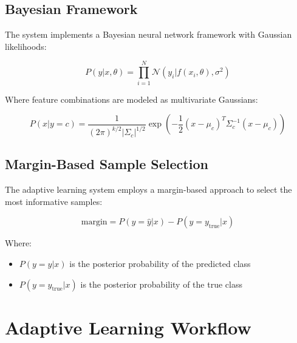 \documentclass[11pt]{article}
\begin{document}
\subsection{Bayesian Framework}

The system implements a Bayesian neural network framework with Gaussian likelihoods:

\[
P(y|x,\theta) = \prod_{i=1}^{N} \mathcal{N}(y_i | f(x_i,\theta), \sigma^2)
\]

Where feature combinations are modeled as multivariate Gaussians:

\[
P(x|y=c) = \frac{1}{(2\pi)^{k/2}|\Sigma_c|^{1/2}} \exp\left(-\frac{1}{2}(x-\mu_c)^T\Sigma_c^{-1}(x-\mu_c)\right)
\]

\subsection{Margin-Based Sample Selection}

The adaptive learning system employs a margin-based approach to select the most informative samples:

\[
\text{margin} = P(y=\hat{y}|x) - P(y=y_{\text{true}}|x)
\]

Where:
\begin{itemize}
\item $P(y=\hat{y}|x)$ is the posterior probability of the predicted class
\item $P(y=y_{\text{true}}|x)$ is the posterior probability of the true class
\end{itemize}

\section{Adaptive Learning Workflow}
\end{document}
